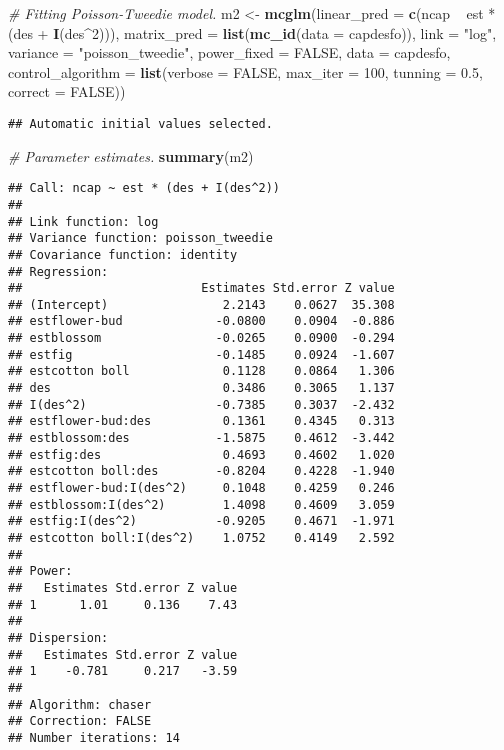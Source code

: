 \documentclass[9pt,a5paper,]{book}
\newenvironment{Shaded}{}{}
\newcommand{\KeywordTok}[1]{\textbf{{#1}}}
\newcommand{\DataTypeTok}[1]{\underline{{#1}}}
\newcommand{\DecValTok}[1]{{#1}}
\newcommand{\FloatTok}[1]{{#1}}
\newcommand{\StringTok}[1]{{#1}}
\newcommand{\CommentTok}[1]{\textit{{#1}}}
\newcommand{\OtherTok}[1]{{#1}}
\newcommand{\NormalTok}[1]{{#1}}
\renewenvironment{Shaded}{\color{inputcolor}}{}
\renewcommand{\DataTypeTok}[1]{{#1}}
\theoremstyle{definition}
\theoremstyle{definition}
\theoremstyle{remark}
\begin{document}
\begin{Shaded}
\begin{Highlighting}[]
\CommentTok{# Fitting Poisson-Tweedie model.}
\NormalTok{m2 <-}\StringTok{ }\KeywordTok{mcglm}\NormalTok{(}\DataTypeTok{linear_pred =} \KeywordTok{c}\NormalTok{(ncap ~}\StringTok{ }\NormalTok{est *}\StringTok{ }\NormalTok{(des +}\StringTok{ }\KeywordTok{I}\NormalTok{(des^}\DecValTok{2}\NormalTok{))),}
            \DataTypeTok{matrix_pred =} \KeywordTok{list}\NormalTok{(}\KeywordTok{mc_id}\NormalTok{(}\DataTypeTok{data =} \NormalTok{capdesfo)),}
            \DataTypeTok{link =} \StringTok{"log"}\NormalTok{,}
            \DataTypeTok{variance =} \StringTok{"poisson_tweedie"}\NormalTok{,}
            \DataTypeTok{power_fixed =} \OtherTok{FALSE}\NormalTok{,}
            \DataTypeTok{data =} \NormalTok{capdesfo,}
            \DataTypeTok{control_algorithm =} \KeywordTok{list}\NormalTok{(}\DataTypeTok{verbose =} \OtherTok{FALSE}\NormalTok{,}
                                     \DataTypeTok{max_iter =} \DecValTok{100}\NormalTok{,}
                                     \DataTypeTok{tunning =} \FloatTok{0.5}\NormalTok{,}
                                     \DataTypeTok{correct =} \OtherTok{FALSE}\NormalTok{))}
\end{Highlighting}
\end{Shaded}

\begin{verbatim}
## Automatic initial values selected.
\end{verbatim}

\begin{Shaded}
\begin{Highlighting}[]
\CommentTok{# Parameter estimates.}
\KeywordTok{summary}\NormalTok{(m2)}
\end{Highlighting}
\end{Shaded}

\begin{verbatim}
## Call: ncap ~ est * (des + I(des^2))
## 
## Link function: log
## Variance function: poisson_tweedie
## Covariance function: identity
## Regression:
##                         Estimates Std.error Z value
## (Intercept)                2.2143    0.0627  35.308
## estflower-bud             -0.0800    0.0904  -0.886
## estblossom                -0.0265    0.0900  -0.294
## estfig                    -0.1485    0.0924  -1.607
## estcotton boll             0.1128    0.0864   1.306
## des                        0.3486    0.3065   1.137
## I(des^2)                  -0.7385    0.3037  -2.432
## estflower-bud:des          0.1361    0.4345   0.313
## estblossom:des            -1.5875    0.4612  -3.442
## estfig:des                 0.4693    0.4602   1.020
## estcotton boll:des        -0.8204    0.4228  -1.940
## estflower-bud:I(des^2)     0.1048    0.4259   0.246
## estblossom:I(des^2)        1.4098    0.4609   3.059
## estfig:I(des^2)           -0.9205    0.4671  -1.971
## estcotton boll:I(des^2)    1.0752    0.4149   2.592
## 
## Power:
##   Estimates Std.error Z value
## 1      1.01     0.136    7.43
## 
## Dispersion:
##   Estimates Std.error Z value
## 1    -0.781     0.217   -3.59
## 
## Algorithm: chaser
## Correction: FALSE
## Number iterations: 14
\end{verbatim}
\end{document}

